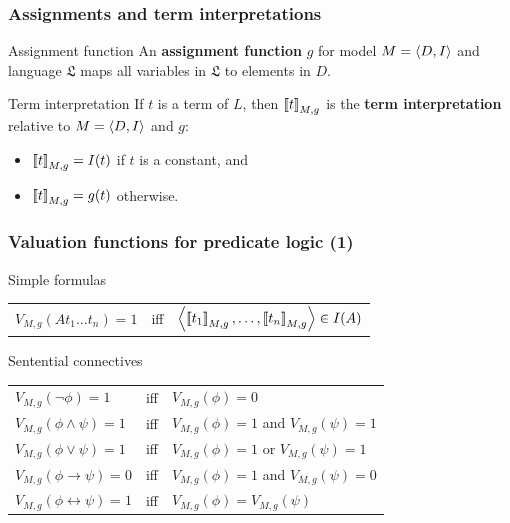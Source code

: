 \documentclass[fleqn,10pt,serif,xcolor=svgnames,xcolor=table,aspectratio=169,handout]{beamer}
\renewcommand{\mymark}[1]{\textbf{{\textcolor{themecolor}{ #1}}}}
\begin{document}
\begin{frame}
  \frametitle{Assignments and term interpretations}

  \begin{block}{Assignment function}
    An \mymark{assignment function} $g$ for model $M = \left \langle D,I\right\rangle$ and language $\mathfrak{L}$ maps all
    variables in $\mathfrak{L}$ to elements in $D$.
  \end{block}

  \begin{block}{Term interpretation}
    If $t$ is a term of $L$, then $\left [\! \left [ t \right ]\! \right]_{M,g}$ is the \mymark{term interpretation} relative to $M = \left \langle D,I\right\rangle$ and $g$:
    \begin{multicols}{2}
      \begin{itemize}
      \item[] $\left [\! \left [ t \right ]\! \right]_{M,g} = I(t)$ if $t$ is a constant, and
      \item[] $\left [\! \left [ t \right ]\! \right]_{M,g} = g(t)$ otherwise.
      \end{itemize}
    \end{multicols}

  \end{block}

\end{frame}

\begin{frame}
  \frametitle{Valuation functions for predicate logic (1)}

  \begin{block}{Simple formulas}
    \begin{tabular}{lcl}
      $V_{M,g}(At_1\dots t_n) =1$ & iff & $\left \langle \left [\! \left [ t_1 \right ]\! \right]_{M,g}, \dots, \left [\! \left [ t_n \right ]\! \right]_{M,g}\right\rangle \in I(A)$
    \end{tabular}
  \end{block}

\begin{block}{Sentential connectives}
    \begin{tabular}{lcl}
      $V_{M,g}(\neg \phi) = 1$ & iff & $V_{M,g}(\phi) =0$\\
      $V_{M,g}(\phi \wedge \psi) = 1$ & iff & $V_{M,g}(\phi) =1$ and $V_{M,g}(\psi) = 1$\\
      $V_{M,g}(\phi \vee \psi) = 1$ & iff & $V_{M,g}(\phi) =1$ or $V_{M,g}(\psi) = 1$\\
      $V_{M,g}(\phi \rightarrow \psi) = 0$ & iff & $V_{M,g}(\phi) =1$ and $V_{M,g}(\psi) = 0$\\
      $V_{M,g}(\phi \leftrightarrow \psi) = 1$ & iff & $V_{M,g}(\phi) = V_{M,g}(\psi)$
    \end{tabular}
  \end{block}

\end{frame}
\end{document}
